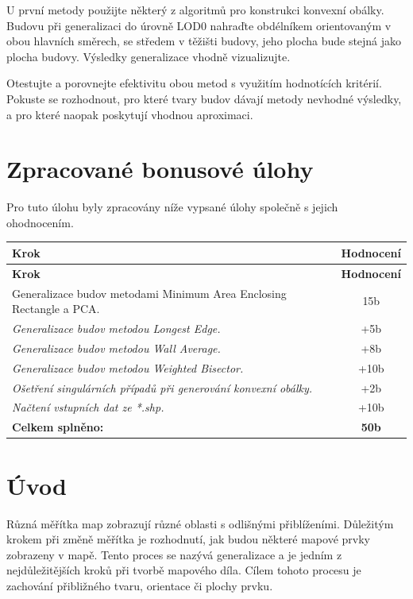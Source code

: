 \documentclass[12pt, a4paper]{article}
\begin{document}
U první metody použijte některý z algoritmů pro konstrukci konvexní obálky. Budovu při generalizaci do úrovně LOD0 nahraďte obdélníkem orientovaným v obou hlavních směrech, se středem v těžišti budovy, jeho plocha bude stejná jako plocha budovy. Výsledky generalizace vhodně vizualizujte.

Otestujte a porovnejte efektivitu obou metod s využitím hodnotících kritérií. Pokuste se rozhodnout, pro které tvary budov dávají metody nevhodné výsledky, a pro které naopak poskytují vhodnou aproximaci.

\section{Zpracované bonusové úlohy}

Pro tuto úlohu byly zpracovány níže vypsané úlohy společně s jejich ohodnocením.



\begin{small}
\begin{longtable}{|p{12cm}|c|}
    \hline
    \textbf{Krok} & \textbf{Hodnocení} \\
    \hline
    \endfirsthead
    
    \hline
    \textbf{Krok} & \textbf{Hodnocení} \\
    \hline
    \endhead

    Generalizace budov metodami Minimum Area Enclosing Rectangle a PCA. & 15b \\
    \hline
    \textit{Generalizace budov metodou Longest Edge.} & +5b \\
    \hline
    \textit{Generalizace budov metodou Wall Average.} & +8b \\
    \hline
    \textit{Generalizace budov metodou Weighted Bisector.} & +10b \\
    \hline
    \textit{Ošetření singulárních případů při generování konvexní obálky.} & +2b \\
    \hline
    \textit{Načtení vstupních dat ze *.shp.} & +10b \\
    \hline
    \textbf{Celkem splněno:} & \textbf{50b} \\
    \hline
\end{longtable}
\end{small}


\section{Úvod}
Různá měřítka map zobrazují různé oblasti s odlišnými přiblíženími. Důležitým krokem při změně měřítka je rozhodnutí, jak budou některé mapové prvky zobrazeny v mapě. Tento proces se nazývá generalizace a je jedním z nejdůležitějších kroků při tvorbě mapového díla. Cílem tohoto procesu je zachování přibližného tvaru, orientace či plochy prvku.
\end{document}
